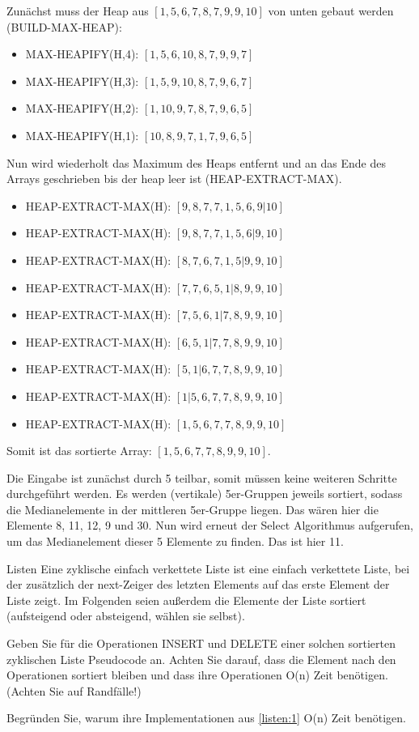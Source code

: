 \documentclass{article}
\begin{document}
\begin{solutions}
  \item Zunächst muss der Heap aus $[1, 5,6, 7,8,7,9, 9,10]$ von unten gebaut werden (BUILD-MAX-HEAP):
  \begin{itemize}
    \item MAX-HEAPIFY(H,4): $[1, 5,6, 10,8,7,9, 9,7]$
    \item MAX-HEAPIFY(H,3): $[1, 5,9, 10,8,7,9, 6,7]$
    \item MAX-HEAPIFY(H,2): $[1, 10,9, 7,8,7,9, 6,5]$
    \item MAX-HEAPIFY(H,1): $[10, 8,9, 7,1,7,9, 6,5]$
  \end{itemize}
  Nun wird wiederholt das Maximum des Heaps entfernt und an das Ende des Arrays geschrieben bis der heap leer ist (HEAP-EXTRACT-MAX).
  \begin{itemize}
    \item HEAP-EXTRACT-MAX(H): $[9, 8,7, 7,1,5,6, 9|10]$
    \item HEAP-EXTRACT-MAX(H): $[9, 8,7, 7,1,5,6|9,10]$
    \item HEAP-EXTRACT-MAX(H): $[8, 7,6, 7,1,5|9,9,10]$
    \item HEAP-EXTRACT-MAX(H): $[7, 7,6, 5,1|8,9,9,10]$
    \item HEAP-EXTRACT-MAX(H): $[7, 5,6, 1|7,8,9,9,10]$
    \item HEAP-EXTRACT-MAX(H): $[6, 5,1|7,7,8,9,9,10]$
    \item HEAP-EXTRACT-MAX(H): $[5, 1|6,7,7,8,9,9,10]$
    \item HEAP-EXTRACT-MAX(H): $[1|5,6,7,7,8,9,9,10]$
    \item HEAP-EXTRACT-MAX(H): $[1,5,6,7,7,8,9,9,10]$
  \end{itemize}
  Somit ist das sortierte Array: $[1,5,6,7,7,8,9,9,10]$.
  \item Die Eingabe ist zunächst durch 5 teilbar, somit müssen keine weiteren Schritte durchgeführt werden. Es werden (vertikale) 5er-Gruppen jeweils sortiert, sodass die Medianelemente in der mittleren 5er-Gruppe liegen. Das wären hier die Elemente 8, 11, 12, 9 und 30. Nun wird erneut der Select Algorithmus aufgerufen, um das Medianelement dieser 5 Elemente zu finden. Das ist hier 11.
\end{solutions}

\begin{eexercises}{Listen}{
    Eine zyklische einfach verkettete Liste ist eine einfach verkettete Liste, bei der zusätzlich der next-Zeiger des letzten Elements auf das erste Element der Liste zeigt. Im Folgenden seien außerdem die Elemente der Liste sortiert (aufsteigend oder absteigend, wählen sie selbst).
  }
  \item\label{listen:1} Geben Sie für die Operationen INSERT und DELETE einer solchen sortierten zyklischen Liste Pseudocode an. Achten Sie darauf, dass die Element nach den Operationen sortiert bleiben und dass ihre Operationen O(n) Zeit benötigen. (Achten Sie auf Randfälle!)
  \item Begründen Sie, warum ihre Implementationen aus \ref{listen:1} O(n) Zeit benötigen.
\end{eexercises}
\end{document}
